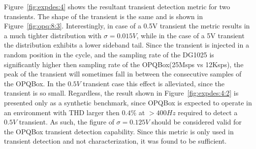 Figure~\ref{fig:expdes:4} shows the resultant transient detection metric for two transients.
The shape of the transient is the same and is shown in Figure~\ref{fig:opq:8:3}.
Interestingly, in case of a 0.5V transient the metric results in a much tighter distribution with $\sigma =0.015V$, while in the case of
a 5V transient the distribution exhibits a lower sideband tail.
Since the transient is injected in a random position in the cycle, and the sampling rate of the DG1025 is significantly higher then sampling rate of the OPQBox(25Msps vs 12Ksps), the peak of the transient will sometimes fall in between the consecutive samples of the OPQBox.
In the $0.5V$ transient case this effect is alleviated, since the transient is so small.
Regardless, the result shown in Figure~\ref{fig:expdes:4:2} is presented only as a synthetic benchmark, since OPQBox is expected to operate in an environment with THD larger then $0.4\%$ at $>400Hz$ required to detect a $0.5V$ transient.
As such, the figure of $\sigma=0.125V$ should be considered valid for the OPQBox transient detection capability.
Since this metric is only used in transient detection and not characterization, it was found to be sufficient.


